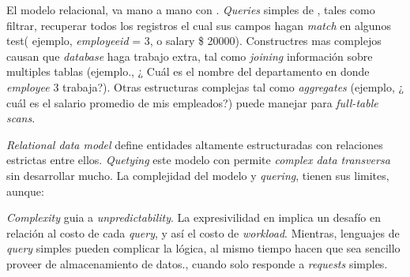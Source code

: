 El modelo relacional, va mano a mano con . \textit{Queries} simples de , tales como filtrar, recuperar todos los registros el cual sus campos hagan \textit{match} en algunos test( ejemplo, \textit{employeeid} = 3, o salary \> \$ 20000). Constructres mas complejos causan que \textit{database} haga trabajo extra, tal como \textit{joining} información sobre multiples tablas (ejemplo., ¿ Cuál es el nombre del departamento en donde \textit{employee} 3 trabaja?). Otras estructuras complejas tal como \textit{aggregates} (ejemplo, ¿ cuál es el salario promedio de mis empleados?) puede manejar para \textit{full-table scans}.


\textit{Relational data model} define entidades altamente estructuradas con relaciones estrictas entre ellos. \textit{Quetying} este modelo con  permite \textit{complex data transversa} sin desarrollar mucho. La complejidad del modelo y \textit{quering}, tienen sus limites, aunque:

\textit{Complexity} guia a \textit{unpredictability}. La expresivilidad en  implica un desafío en relación al costo de cada \textit{query}, y así el costo de \textit{workload}. Mientras, lenguajes de \textit{query} simples pueden complicar la lógica, al mismo tiempo hacen que sea sencillo proveer de almacenamiento de datos., cuando solo responde a \textit{requests} simples.

